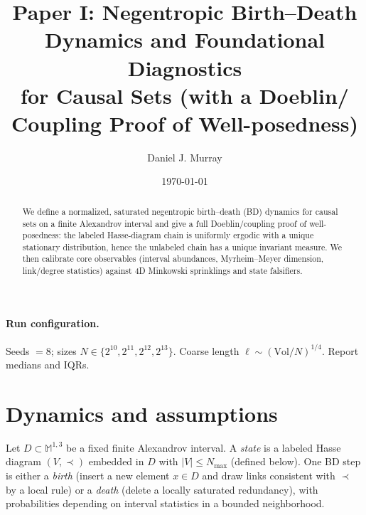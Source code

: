 \theoremstyle{plain}
\newtheorem{theorem}{Theorem}
\newtheorem{lemma}[theorem]{Lemma}
\newtheorem{proposition}[theorem]{Proposition}
\theoremstyle{definition}
\newtheorem{definition}[theorem]{Definition}
\theoremstyle{remark}
\newtheorem{remark}[theorem]{Remark}

\newcommand{\E}{\mathbb{E}}
\newcommand{\ellc}{\ell} %

\graphicspath{{figs1/}{paper1/figs/}}
\newcommand{\SafeGraphic}[2]{%
  \IfFileExists{#1}{\texttt{[image: \#1]}}{%
    \fbox{\parbox[c][2.0in][c]{#2\linewidth}{\centering\small \textsf{Missing figure:}\\\texttt{#1}}}}}

\title{Paper I: Negentropic Birth--Death Dynamics and Foundational Diagnostics\\
for Causal Sets (with a Doeblin/ Coupling Proof of Well-posedness)}
\author{Daniel J. Murray}
\date{\today}


\maketitle

\begin{abstract}
We define a normalized, saturated negentropic birth--death (BD) dynamics for causal sets on a finite Alexandrov interval and give a full Doeblin/coupling proof of well-posedness: the labeled Hasse-diagram chain is uniformly ergodic with a unique stationary distribution, hence the unlabeled chain has a unique invariant measure. We then calibrate core observables (interval abundances, Myrheim--Meyer dimension, link/degree statistics) against 4D Minkowski sprinklings and state falsifiers.
\end{abstract}

\paragraph{Run configuration.}
Seeds $=8$; sizes $N\in\{2^{10},2^{11},2^{12},2^{13}\}$. Coarse length $\ellc\sim(\mathrm{Vol}/N)^{1/4}$. Report medians and IQRs.

\section{Dynamics and assumptions}
Let $D\subset \mathbb{M}^{1,3}$ be a fixed finite Alexandrov interval. A \emph{state} is a labeled Hasse diagram $(V,\prec)$ embedded in $D$ with $|V|\le N_{\max}$ (defined below). One BD step is either a \emph{birth} (insert a new element $x\in D$ and draw links consistent with $\prec$ by a local rule) or a \emph{death} (delete a locally saturated redundancy), with probabilities depending on interval statistics in a bounded neighborhood.

